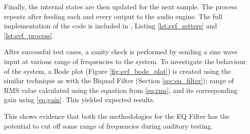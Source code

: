 Finally, the internal states are then updated for the next sample. The process repeats after feeding each and every output
to the audio engine. The full implementation of the code is included in , Listing \ref{lst:svf_setters} and 
\ref{lst:svf_process}.

After successful test cases, a sanity check is performed by sending a sine wave input at various range
of frequencies to the system. To investigate the behaviour of the system, a Bode plot (Figure \ref{fig:svf_bode_plot}) 
is created using the similar technique as with the Biquad Filter (Section \ref{sec:eq_filter}); range of RMS value 
calculated using the equation from \eqref{eq:rms}, and its corresponding gain using \eqref{eq:gain}. This yielded 
expected results.



This shows evidence that both the methodologies for the EQ Filter has the potential to cut off some range of 
frequencies during auditory testing.

